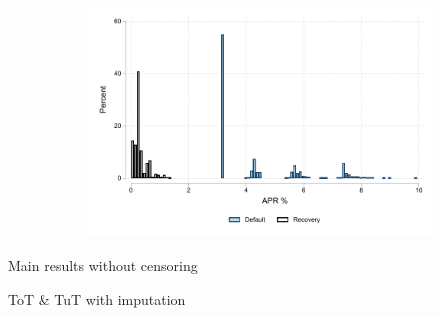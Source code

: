 \documentclass[oneside,11pt]{article}
\begin{document}
\begin{figure}[H]
\begin{center}
\begin{subfigure}{0.45\textwidth}
      \includegraphics[width=\textwidth]{Figuras/hist_apr_1_1.pdf}
    \end{subfigure}    
    \end{center}
        
\end{figure}


\begin{table}[H]
\caption{Main results without censoring }
\label{mns}
\begin{center}
\scriptsize{}
\end{center}
 \scriptsize 
\end{table}


\begin{table}[H]
\caption{ToT \& TuT with imputation}
\label{mns}
\begin{center}
\scriptsize{}
\end{center}
 \scriptsize 
\end{table}
\end{document}
